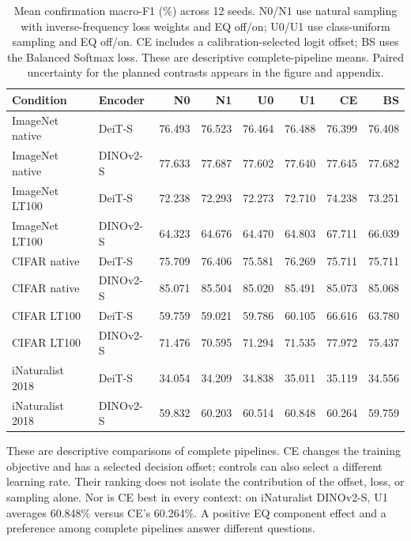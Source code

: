 \documentclass[conference]{IEEEtran}
\begin{document}
\begin{table}[t]
\centering\footnotesize
\caption{Mean confirmation macro-F1 (\%) across 12 seeds. N0/N1 use natural sampling with inverse-frequency loss weights and EQ off/on; U0/U1 use class-uniform sampling and EQ off/on. CE includes a calibration-selected logit offset; BS uses the Balanced Softmax loss. These are descriptive complete-pipeline means. Paired uncertainty for the planned contrasts appears in the figure and appendix.}
\label{tab:arms}
\begin{tabular}{llrrrrrr}
\toprule
Condition & Encoder & N0 & N1 & U0 & U1 & CE & BS \\
\midrule
ImageNet native & DeiT-S & 76.493 & 76.523 & 76.464 & 76.488 & 76.399 & 76.408 \\
ImageNet native & DINOv2-S & 77.633 & 77.687 & 77.602 & 77.640 & 77.645 & 77.682 \\
\addlinespace[2pt]
ImageNet LT100 & DeiT-S & 72.238 & 72.293 & 72.273 & 72.710 & 74.238 & 73.251 \\
ImageNet LT100 & DINOv2-S & 64.323 & 64.676 & 64.470 & 64.803 & 67.711 & 66.039 \\
\addlinespace[2pt]
CIFAR native & DeiT-S & 75.709 & 76.406 & 75.581 & 76.269 & 75.711 & 75.711 \\
CIFAR native & DINOv2-S & 85.071 & 85.504 & 85.020 & 85.491 & 85.073 & 85.068 \\
\addlinespace[2pt]
CIFAR LT100 & DeiT-S & 59.759 & 59.021 & 59.786 & 60.105 & 66.616 & 63.780 \\
CIFAR LT100 & DINOv2-S & 71.476 & 70.595 & 71.294 & 71.535 & 77.972 & 75.437 \\
\addlinespace[2pt]
iNaturalist 2018 & DeiT-S & 34.054 & 34.209 & 34.838 & 35.011 & 35.119 & 34.556 \\
iNaturalist 2018 & DINOv2-S & 59.832 & 60.203 & 60.514 & 60.848 & 60.264 & 59.759 \\
\bottomrule
\end{tabular}
\end{table}

These are descriptive comparisons of complete pipelines. CE changes the training objective and has a selected decision offset; controls can also select a different learning rate. Their ranking does not isolate the contribution of the offset, loss, or sampling alone. Nor is CE best in every context: on iNaturalist DINOv2-S, U1 averages 60.848\% versus CE's 60.264\%. A positive EQ component effect and a preference among complete pipelines answer different questions.
\end{document}

